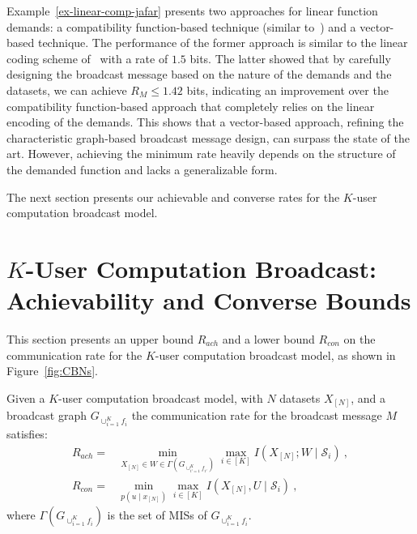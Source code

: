 \documentclass[conference, letterpaper]{IEEEtran} %
\begin{document}
Example~\ref{ex-linear-comp-jafar} presents two approaches for linear function demands: a compatibility function-based technique (similar to~\cite{yao2024capacity}) and a vector-based technique. 
The performance of the former approach is similar to the linear coding scheme of~\cite[Example~2]{yao2024capacity} with a rate of $1.5$ bits. The latter %
showed that by carefully designing the broadcast message based on the nature of the demands and the datasets, we can achieve $R_{M}\leq 1.42$ bits, indicating an improvement over the compatibility function-based approach that completely relies on the linear encoding of the demands. 
This shows that a vector-based approach, refining the characteristic graph-based broadcast message design, can surpass the state of the art. However, achieving the minimum rate heavily depends on the structure of the demanded function and lacks a generalizable form. 

The next section presents our achievable and converse rates for the $K$-user computation broadcast model.






\section{\texorpdfstring{$K$}{}-User Computation Broadcast: Achievability and Converse Bounds}
\label{sec:main-resu}
This section presents an upper bound $R_{ach}$ and a lower bound $R_{con}$ on the communication rate for the $K$-user computation broadcast model, as shown in Figure~\ref{fig:CBNs}. 



\begin{theo}
\label{theo-inner-and-outer}
    Given a $K$-user computation broadcast model, with $N$ datasets $X_{[N]}$, and a  broadcast graph $G_{\cup_{i=1}^{K}f_i}$ the communication rate for the broadcast message $M$ satisfies:
    \begin{align}
    \label{eq-theo-inner-and-outer}
        R_{ach}= &\min_{X_{[N]}\in W\in \Gamma(G_{\cup_{i'=1}^{K}f_{i'}})}\max_{i\in [K]}I(X_{[N]};W\mid \mathcal{S}_{i}) \ ,\\
        R_{con}=&\min_{p(u\mid x_{[N]})}\max_{i\in [K]}I(X_{[N]},U\mid \mathcal{S}_{i}) \ ,
    \end{align}
    where $\Gamma(G_{\cup_{i=1}^{K}f_i})$ is the set of MISs of $G_{\cup_{i=1}^{K}f_i}$.
\end{theo}
\end{document}
